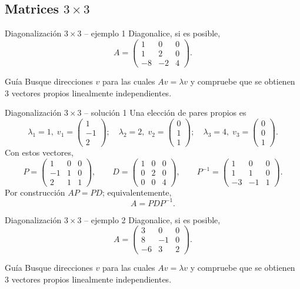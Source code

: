 \documentclass[aspectratio=169,10pt]{beamer}
\begin{document}
\subsection{Matrices $3\times 3$}
\begin{frame}{Diagonalización $3\times 3$ -- ejemplo 1}
\small
Diagonalice, si es posible,
\[
A=\begin{pmatrix}1 & 0 & 0\\1 & 2 & 0\\-8 & -2 & 4\end{pmatrix}.
\]
\begin{block}{Guía}
Busque direcciones $v$ para las cuales $Av=\lambda v$ y compruebe que se obtienen $3$ vectores propios linealmente independientes.
\end{block}
\end{frame}
\begin{frame}{Diagonalización $3\times 3$ -- solución 1}
\scriptsize
Una elección de pares propios es
\[
\lambda_1=1,\;v_1=\begin{pmatrix}1\\-1\\2\end{pmatrix};\quad \lambda_2=2,\;v_2=\begin{pmatrix}0\\1\\1\end{pmatrix};\quad \lambda_3=4,\;v_3=\begin{pmatrix}0\\0\\1\end{pmatrix}.
\]
Con estos vectores,
\[
P=\begin{pmatrix}1 & 0 & 0\\-1 & 1 & 0\\2 & 1 & 1\end{pmatrix},\qquad D=\begin{pmatrix}1 & 0 & 0\\0 & 2 & 0\\0 & 0 & 4\end{pmatrix},\qquad P^{-1}=\begin{pmatrix}1 & 0 & 0\\1 & 1 & 0\\-3 & -1 & 1\end{pmatrix}.
\]
Por construcción $AP=PD$; equivalentemente,
\[
\boxed{A=PDP^{-1}}.
\]
\end{frame}
\begin{frame}{Diagonalización $3\times 3$ -- ejemplo 2}
\small
Diagonalice, si es posible,
\[
A=\begin{pmatrix}3 & 0 & 0\\8 & -1 & 0\\-6 & 3 & 2\end{pmatrix}.
\]
\begin{block}{Guía}
Busque direcciones $v$ para las cuales $Av=\lambda v$ y compruebe que se obtienen $3$ vectores propios linealmente independientes.
\end{block}
\end{frame}
\end{document}
